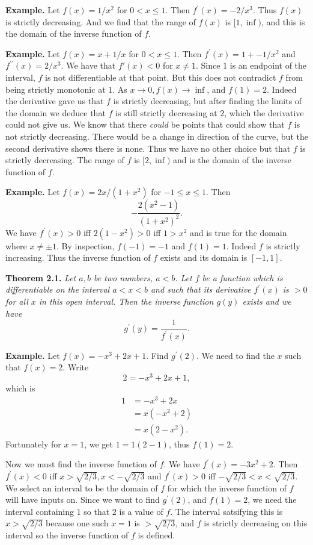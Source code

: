   \textbf{Example.} Let $f(x) = 1/x^2$ for $0 < x \le 1$. Then $f^\prime(x) = -2/x^3$. Thus $f(x)$ is strictly decreasing. And we find that the range of $f(x)$ is $[1, \inf)$, and this is the domain of the inverse function of $f$.
    
    \textbf{Example.} Let $f(x) = x + 1/x$ for $0 < x \le 1$. Then $f^\prime(x) = 1 + -1/x^2$ and $f^{\prime\prime}(x) = 2/x^3$. We have that $f'(x) < 0$ for $x \ne 1$. Since $1$ is an endpoint of the interval, $f$ is not differentiable at that point. But this does not contradict $f$ from being strictly monotonic at $1$. As $x \to 0, f(x) \to \inf$, and $f(1) = 2$. Indeed the derivative gave us that $f$ is strictly decreasing, but after finding the limits of the domain we deduce that $f$ is still strictly decreasing at $2$, which the derivative could not give us. We know that there \textit{could} be points that could show that $f$ is not strictly decreasing. There would be a change in direction of the curve, but the second derivative shows there is none. Thus we have no other choice but that $f$ is strictly decreasing. The range of $f$ is $[2, \inf)$ and is the domain of the inverse function of $f$.

      \textbf{Example.} Let $f(x) = 2x/(1 + x^2)$ for $-1 \le x \le 1$. Then
      \[-\frac{2(x^2 - 1)}{(1 + x^2)^2}.\]
      We have $f^\prime(x) > 0$ iff $2(1 - x^2) > 0$ iff $1 > x^2$ and is true for the domain where $x \ne \pm 1$. By inspection, $f(-1) = -1$ and $f(1) = 1$. Indeed $f$ is strictly increasing. Thus the inverse function of $f$ exists and its domain is $[-1, 1]$.
      
      \textbf{Theorem 2.1.} \textit{Let $a, b$ be two numbers, $a < b$. Let $f$ be a function which is differentiable on the interval $a < x < b$ and such that its derivative $f^\prime(x)$ is $> 0$ for all $x$ in this open interval. Then the inverse function $g(y)$ exists and we have}
      \[g^\prime(y) = \frac{1}{f^\prime(x)}.\]

      \textbf{Example.} Let $f(x) = -x^3 + 2x + 1$. Find $g^\prime(2)$. We need to find the $x$ such that $f(x) = 2$. Write
      \[2 = -x^3 + 2x + 1,\]
      which is
      \begin{align*}
        1 &= -x^3 + 2x\\
        &= x(-x^2 + 2)\\
        &= x(2 - x^2).
      \end{align*}
      Fortunately for $x = 1$, we get $1 = 1(2 - 1)$, thus $f(1) = 2$.
      
      Now we must find the inverse function of $f$. We have $f^\prime(x) = -3x^2 + 2$. Then $f^\prime(x) < 0$ iff $x > \sqrt{2/3}, x < -\sqrt{2/3}$ and $f^\prime(x) > 0$ iff $-\sqrt{2/3} < x < \sqrt{2/3}$. We select an interval to be the domain of $f$ for which the inverse function of $f$ will have inputs on. Since we want to find $g^\prime(2)$, and $f(1) = 2$, we need the interval containing 1 so that $2$ is a value of $f$. The interval satsifying this is $x > \sqrt{2/3}$ because one such $x = 1$ is $> \sqrt{2/3}$, and $f$ is strictly decreasing on this interval so the inverse function of $f$ is defined.
      
